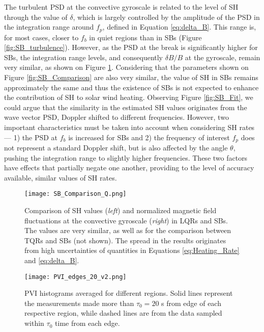 \documentclass[]{aastex62}
\begin{document}
The turbulent PSD at the convective gyroscale is related to the level of SH through the value of $\delta$, which is largely controlled by the amplitude of the PSD in the integration range around $f_p$, defined in Equation \ref{eq:delta_B}. This range is, for most cases, closer to $f_b$ in quiet regions than in SBs (Figure \ref{fig:SB_turbulence}). However, as the PSD at the break is significantly higher for SBs, the integration range levels, and consequently $\delta B / B$ at the gyroscale, remain very similar, as shown on Figure \ref{fig:SB_SH}. Considering that the parameters shown on Figure \ref{fig:SB_Comparison} are also very similar, the value of SH in SBs remains approximately the same and thus the existence of SBs is not expected to enhance the contribution of SH to solar wind heating. Observing Figure \ref{fig:SB_Fit}, we could argue that the similarity in the estimated SH values originates from the wave vector PSD, Doppler shifted to different frequencies. However, two important characteristics must be taken into account when considering SH rates --- 1) the PSD at $f_b$ is increased for SBs and 2) the frequency of interest $f_p$ does not represent a standard Doppler shift, but is also affected by the angle $\theta$, pushing the integration range to slightly higher frequencies. These two factors have effects that partially negate one another, providing to the level of accuracy available, similar values of SH rates.


\begin{figure}
\centering
\texttt{[image: SB\_Comparison\_Q.png]}
\caption{Comparison of SH values (\emph{left}) and normalized magnetic field fluctuations at the convective gyroscale (\emph{right}) in LQRs and SBs. The values are very similar, as well as for the comparison between TQRs and SBs (not shown). The spread in the results originates from high uncertainties of quantities in Equations \ref{eq:Heating_Rate} and \ref{eq:delta_B}.}
\label{fig:SB_SH}
\end{figure}


\begin{figure}
\centering
\texttt{[image: PVI\_edges\_20\_v2.png]}
\caption{PVI histograms averaged for different regions. Solid lines represent the measurements made more than $\tau_0 = 20$ s from edge of each respective region, while dashed lines are from the data sampled within $\tau_0$ time from each edge.}
\label{fig:SB_PVI}
\end{figure}


\end{document}

